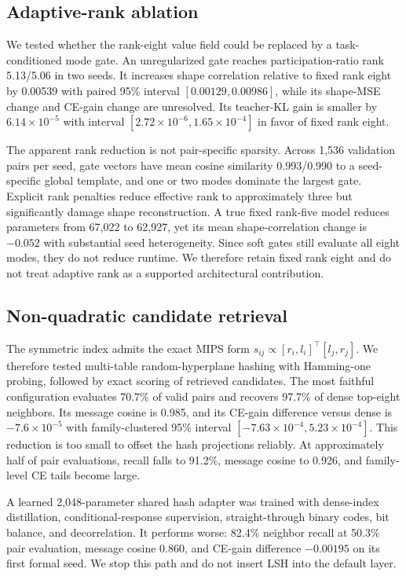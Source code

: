 \documentclass[10pt]{article}
\begin{document}
\subsection{Adaptive-rank ablation}

We tested whether the rank-eight value field could be replaced by a task-conditioned mode gate.
An unregularized gate reaches participation-ratio rank 5.13/5.06 in two seeds. It increases
shape correlation relative to fixed rank eight by 0.00539 with paired 95\% interval
$[0.00129,0.00986]$, while its shape-MSE change and CE-gain change are unresolved. Its
teacher-KL gain is smaller by $6.14\times10^{-5}$ with interval
$[2.72\times10^{-6},1.65\times10^{-4}]$ in favor of fixed rank eight.

The apparent rank reduction is not pair-specific sparsity. Across 1,536 validation pairs per
seed, gate vectors have mean cosine similarity 0.993/0.990 to a seed-specific global template,
and one or two modes dominate the largest gate. Explicit rank penalties reduce effective rank
to approximately three but significantly damage shape reconstruction. A true fixed rank-five
model reduces parameters from 67,022 to 62,927, yet its mean shape-correlation change is
$-0.052$ with substantial seed heterogeneity. Since soft gates still evaluate all eight modes,
they do not reduce runtime. We therefore retain fixed rank eight and do not treat adaptive rank
as a supported architectural contribution.

\subsection{Non-quadratic candidate retrieval}

The symmetric index admits the exact MIPS form
$s_{ij}\propto[r_i,l_i]^\top[l_j,r_j]$.  We therefore tested multi-table random-hyperplane
hashing with Hamming-one probing, followed by exact scoring of retrieved candidates.  The most
faithful configuration evaluates 70.7\% of valid pairs and recovers 97.7\% of dense top-eight
neighbors.  Its message cosine is 0.985, and its CE-gain difference versus dense is
$-7.6\times10^{-5}$ with family-clustered 95\% interval
$[-7.63\times10^{-4},5.23\times10^{-4}]$.  This reduction is too small to offset the hash
projections reliably.  At approximately half of pair evaluations, recall falls to 91.2\%,
message cosine to 0.926, and family-level CE tails become large.

A learned 2,048-parameter shared hash adapter was trained with dense-index distillation,
conditional-response supervision, straight-through binary codes, bit balance, and decorrelation.
It performs worse: 82.4\% neighbor recall at 50.3\% pair evaluation, message cosine 0.860, and
CE-gain difference $-0.00195$ on its first formal seed.  We stop this path and do not insert LSH
into the default layer.
\end{document}
